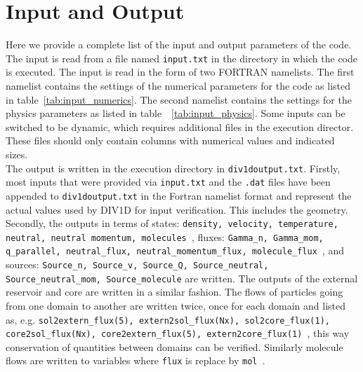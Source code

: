 \documentclass[amsmath,amssymb,a4]{revtex4-2}
\begin{document}
\section{Input and Output}\label{IO}

Here we provide a complete list of the input and output parameters of the code. The input is read from a file named {\tt input.txt} in the directory in which the code is executed. The input is read in the form of two FORTRAN namelists. The first namelist contains the settings of the numerical parameters for the code as listed in table~\ref{tab:input_numerics}. The second namelist contains the settings for the physics parameters as listed in table~~\ref{tab:input_physics}. Some inputs can be switched to be dynamic, which requires additional files in the execution director. These files should only contain columns with numerical values and indicated sizes. \\

The output is written in the execution directory in {\tt div1doutput.txt}. Firstly, most inputs that were provided via {\tt input.txt} and the {\tt *.dat} files have been appended to {\tt div1doutput.txt} in the Fortran namelist format and represent the actual values used by DIV1D for input verification. This includes the geometry. Secondly, the outputs in terms of states: {\tt density, velocity, temperature, neutral, neutral momentum, molecules }, fluxes: {\tt Gamma\_n, Gamma\_mom, q\_parallel, neutral\_flux, neutral\_momentum\_flux, molecule\_flux }, and sources: {\tt Source\_n, Source\_v, Source\_Q, Source\_neutral, Source\_neutral\_mom, Source\_molecule} are written. The outputs of the external reservoir and core are written in a similar fashion. The flows of particles going from one domain to another are written twice, once for each domain and listed as, e.g. {\tt sol2extern\_flux(5), extern2sol\_flux(Nx), sol2core\_flux(1), core2sol\_flux(Nx), core2extern\_flux(5), extern2core\_flux(1) }, this way conservation of quantities between domains can be verified. Similarly molecule flows are written to variables where {\tt flux} is replace by { \tt mol }. 
\end{document}

